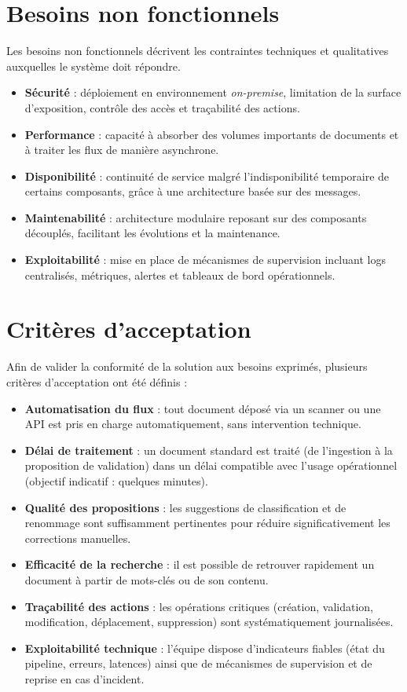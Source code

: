 \documentclass[12pt,a4paper]{report}
\begin{document}
\section{Besoins non fonctionnels}
Les besoins non fonctionnels décrivent les contraintes techniques et qualitatives auxquelles le système doit répondre.
\begin{itemize}
  \item \textbf{Sécurité} : déploiement en environnement \textit{on-premise}, limitation de la surface d’exposition, contrôle des accès et traçabilité des actions.
  \item \textbf{Performance} : capacité à absorber des volumes importants de documents et à traiter les flux de manière asynchrone.
  \item \textbf{Disponibilité} : continuité de service malgré l’indisponibilité temporaire de certains composants, grâce à une architecture basée sur des messages.
  \item \textbf{Maintenabilité} : architecture modulaire reposant sur des composants découplés, facilitant les évolutions et la maintenance.
  \item \textbf{Exploitabilité} : mise en place de mécanismes de supervision incluant logs centralisés, métriques, alertes et tableaux de bord opérationnels.
\end{itemize}

\section{Critères d’acceptation}
Afin de valider la conformité de la solution aux besoins exprimés, plusieurs critères d’acceptation ont été définis :
\begin{itemize}
  \item \textbf{Automatisation du flux} : tout document déposé via un scanner ou une API est pris en charge automatiquement, sans intervention technique.
  \item \textbf{Délai de traitement} : un document standard est traité (de l’ingestion à la proposition de validation) dans un délai compatible avec l’usage opérationnel (objectif indicatif : quelques minutes).
  \item \textbf{Qualité des propositions} : les suggestions de classification et de renommage sont suffisamment pertinentes pour réduire significativement les corrections manuelles.
  \item \textbf{Efficacité de la recherche} : il est possible de retrouver rapidement un document à partir de mots-clés ou de son contenu.
  \item \textbf{Traçabilité des actions} : les opérations critiques (création, validation, modification, déplacement, suppression) sont systématiquement journalisées.
  \item \textbf{Exploitabilité technique} : l’équipe dispose d’indicateurs fiables (état du pipeline, erreurs, latences) ainsi que de mécanismes de supervision et de reprise en cas d’incident.
\end{itemize}
\end{document}
